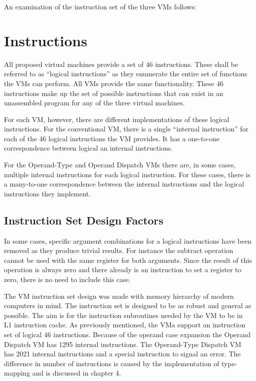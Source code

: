 \documentclass[english,a4paper,12pt]{report}
\begin{document}
An examination of the instruction set of the three VMs follows:

\section{Instructions}

All proposed virtual machines provide a set of 46 instructions. These
shall be referred to as ``logical instructions'' as they enumerate the
entire set of functions the VMs can perform. All VMs provide the same
functionality. These 46 instructions make up the set of possible
instructions that can exist in an unassembled program for any of the
three virtual machines. 

For each VM, however, there are different implementations of these
logical instructions. For the conventional VM, there is a single
``internal instruction'' for each of the 46 logical instructions the
VM provides. It has a one-to-one correspondence between logical an
internal instructions. 

For the Operand-Type and Operand Dispatch VMs there are, in some
cases, multiple internal instructions for each logical
instruction. For these cases, there is a many-to-one correspondence
between the internal instructions and the logical instructions they
implement.

\subsection{Instruction Set Design Factors}
\label{sec:inst-set-design-factors}
In some cases, specific argument combinations for a logical
instructions have been removed as they produce trivial results. For
instance the subtract operation cannot be used with the same register
for both arguments. Since the result of this operation is always zero
and there already is an instruction to set a register to zero, there
is no need to include this case.

The VM instruction set design was made with memory hierarchy of modern
computers in mind. The instruction set is designed to be as robust and
general as possible. The aim is for the instruction subroutines needed
by the VM to be in L1 instruction cache. As previously mentioned, the
VMa support an instruction set of logical 46 instructions. Because of
the operand case expansion the Operand Dispatch VM has 1295 internal
instructions. The Operand-Type Dispatch VM has 2021 internal
instructions and a special instruction to signal an error. The
difference in number of instructions is caused by the implementation
of type-mapping and is discussed in chapter 4.
\end{document}
